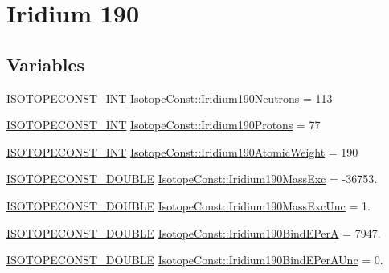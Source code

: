\hypertarget{group___isotope_const-_iridium-_ir190}{}\section{Iridium 190}
\label{group___isotope_const-_iridium-_ir190}
\subsection*{Variables}
\begin{DoxyCompactItemize}
\item 
\mbox{\hyperlink{group___isotope_const-_macros_ga5f18360b3e99483a35c32d789e62621c}{I\+S\+O\+T\+O\+P\+E\+C\+O\+N\+S\+T\+\_\+\+I\+NT}} \mbox{\hyperlink{group___isotope_const-_iridium-_ir190_ga5446fe2ec1a30acf0f1667cdf40d2761}{Isotope\+Const\+::\+Iridium190\+Neutrons}} = 113
\item 
\mbox{\hyperlink{group___isotope_const-_macros_ga5f18360b3e99483a35c32d789e62621c}{I\+S\+O\+T\+O\+P\+E\+C\+O\+N\+S\+T\+\_\+\+I\+NT}} \mbox{\hyperlink{group___isotope_const-_iridium-_ir190_ga32d9f3f242838075e60330472d6178ba}{Isotope\+Const\+::\+Iridium190\+Protons}} = 77
\item 
\mbox{\hyperlink{group___isotope_const-_macros_ga5f18360b3e99483a35c32d789e62621c}{I\+S\+O\+T\+O\+P\+E\+C\+O\+N\+S\+T\+\_\+\+I\+NT}} \mbox{\hyperlink{group___isotope_const-_iridium-_ir190_gacae3f555c210012e6c58b6696a37f4e9}{Isotope\+Const\+::\+Iridium190\+Atomic\+Weight}} = 190
\item 
\mbox{\hyperlink{group___isotope_const-_macros_ga8f45a7272ce02c0b4c65c44636ed719a}{I\+S\+O\+T\+O\+P\+E\+C\+O\+N\+S\+T\+\_\+\+D\+O\+U\+B\+LE}} \mbox{\hyperlink{group___isotope_const-_iridium-_ir190_ga50d78172ccb75ced824e0dab6edf12ee}{Isotope\+Const\+::\+Iridium190\+Mass\+Exc}} = -\/36753.
\item 
\mbox{\hyperlink{group___isotope_const-_macros_ga8f45a7272ce02c0b4c65c44636ed719a}{I\+S\+O\+T\+O\+P\+E\+C\+O\+N\+S\+T\+\_\+\+D\+O\+U\+B\+LE}} \mbox{\hyperlink{group___isotope_const-_iridium-_ir190_ga3efd9098912e576ef555ab839d493978}{Isotope\+Const\+::\+Iridium190\+Mass\+Exc\+Unc}} = 1.
\item 
\mbox{\hyperlink{group___isotope_const-_macros_ga8f45a7272ce02c0b4c65c44636ed719a}{I\+S\+O\+T\+O\+P\+E\+C\+O\+N\+S\+T\+\_\+\+D\+O\+U\+B\+LE}} \mbox{\hyperlink{group___isotope_const-_iridium-_ir190_gab7960c24f4b07661e1a6dba7616b4f54}{Isotope\+Const\+::\+Iridium190\+Bind\+E\+PerA}} = 7947.
\item 
\mbox{\hyperlink{group___isotope_const-_macros_ga8f45a7272ce02c0b4c65c44636ed719a}{I\+S\+O\+T\+O\+P\+E\+C\+O\+N\+S\+T\+\_\+\+D\+O\+U\+B\+LE}} \mbox{\hyperlink{group___isotope_const-_iridium-_ir190_ga6e22a2b3c7af4bf1763395a1081cf99c}{Isotope\+Const\+::\+Iridium190\+Bind\+E\+Per\+A\+Unc}} = 0.

\end{DoxyCompactItemize}
